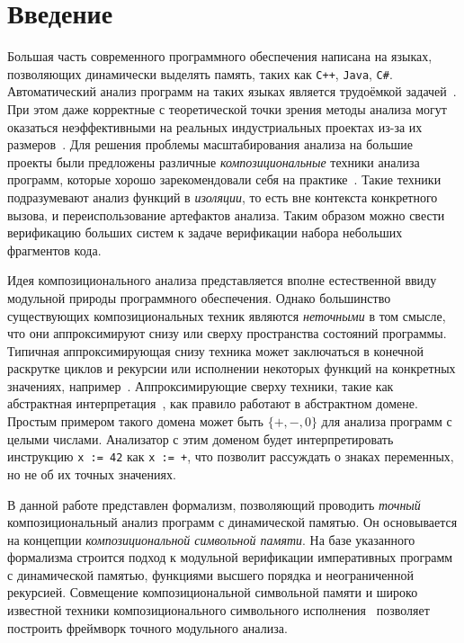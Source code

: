 \section*{Введение}

Большая часть современного программного обеспечения написана на языках, позволяющих  динамически выделять память, таких как \texttt{C++}, \texttt{Java}, \texttt{C\#}. Автоматический анализ программ на таких языках является трудоёмкой задачей~\cite{distefano2009attacking}. При этом даже корректные с теоретической точки зрения методы анализа могут оказаться неэффективными на реальных индустриальных проектах из-за их размеров~\cite{calcagno2011compositional}. Для решения проблемы масштабирования анализа на большие проекты были предложены различные \emph{композициональные} техники анализа программ, которые хорошо зарекомендовали себя на практике~\cite{gurfinkel2015seahorn,anand2008demand,distefano2008jstar,calcagno2011infer}. Такие техники подразумевают анализ функций в \emph{изоляции}, то есть вне контекста конкретного вызова, и переиспользование артефактов анализа. Таким образом можно свести верификацию больших систем к задаче верификации набора небольших фрагментов кода.

Идея композиционального анализа представляется вполне естественной ввиду модульной природы программного обеспечения. Однако большинство существующих композициональных техник являются \emph{неточными} в том смысле, что они аппроксимируют снизу или сверху пространства состояний программы. Типичная аппроксимирующая снизу техника может заключаться в конечной раскрутке циклов и рекурсии или исполнении некоторых функций на конкретных значениях, например~\cite{tillmann2008pex}. Аппроксимирующие сверху техники, такие как абстрактная интерпретация~\cite{cousot1977abstract}, как правило работают в абстрактном домене. Простым примером такого домена может быть $\{+, -, 0\}$ для анализа программ с целыми числами. Анализатор с этим доменом будет интерпретировать инструкцию \lstinline{x := 42} как \lstinline{x := +}, что позволит рассуждать о знаках переменных, но не об их точных значениях.

В данной работе представлен формализм, позволяющий проводить \emph{точный} композициональный анализ программ с динамической памятью. Он основывается на концепции \emph{композициональной символьной памяти}. На базе указанного формализма строится подход к модульной верификации императивных программ с динамической памятью, функциями высшего порядка и неограниченной рекурсией. Совмещение композициональной символьной памяти и широко известной техники композиционального символьного исполнения~\cite{godefroid2007compositional} позволяет построить фреймворк точного модульного анализа.


